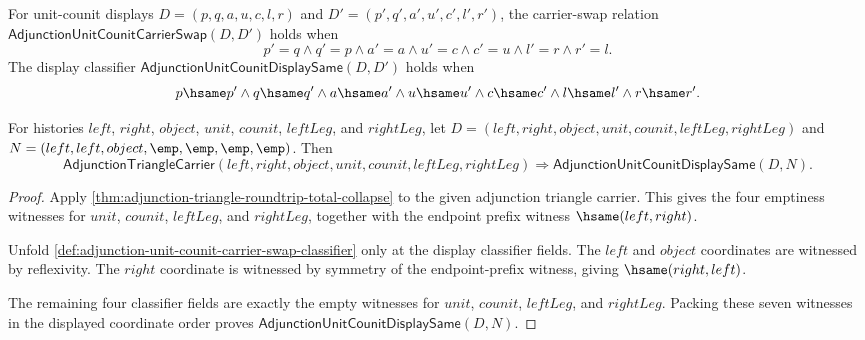 \begin{definition}
\label{def:adjunction-unit-counit-carrier-swap-classifier}
For unit-counit displays $D=(p,q,a,u,c,l,r)$ and
$D'=(p',q',a',u',c',l',r')$, the carrier-swap relation
$\mathsf{AdjunctionUnitCounitCarrierSwap}(D,D')$ holds when
$$
p'=q\land q'=p\land a'=a\land u'=c\land c'=u\land l'=r\land r'=l.
$$
The display classifier $\mathsf{AdjunctionUnitCounitDisplaySame}(D,D')$ holds
when
$$
p\hsame p'\land q\hsame q'\land a\hsame a'\land u\hsame u'
\land c\hsame c'\land l\hsame l'\land r\hsame r'.
$$
\end{definition}

\begin{theorem}
\label{thm:adjunction-triangle-display-empty-normal-form}
For histories $left$, $right$, $object$, $unit$, $counit$, $leftLeg$, and
$rightLeg$, let
$D=(left,right,object,unit,counit,leftLeg,rightLeg)$ and
$N=(left,left,object,\emp,\emp,\emp,\emp)$. Then
$$
\mathsf{AdjunctionTriangleCarrier}(left,right,object,unit,counit,leftLeg,rightLeg)
\Longrightarrow
\mathsf{AdjunctionUnitCounitDisplaySame}(D,N).
$$
\end{theorem}
\begin{proof}
Apply \autoref{thm:adjunction-triangle-roundtrip-total-collapse} to the
given adjunction triangle carrier. This gives the four emptiness witnesses
for $unit$, $counit$, $leftLeg$, and $rightLeg$, together with the endpoint
prefix witness $\hsame(left,right)$.

Unfold \autoref{def:adjunction-unit-counit-carrier-swap-classifier} only at
the display classifier fields. The $left$ and $object$ coordinates are
witnessed by reflexivity. The $right$ coordinate is witnessed by symmetry of
the endpoint-prefix witness, giving $\hsame(right,left)$.

The remaining four classifier fields are exactly the empty witnesses for
$unit$, $counit$, $leftLeg$, and $rightLeg$. Packing these seven witnesses in
the displayed coordinate order proves
$\mathsf{AdjunctionUnitCounitDisplaySame}(D,N)$.
\end{proof}



